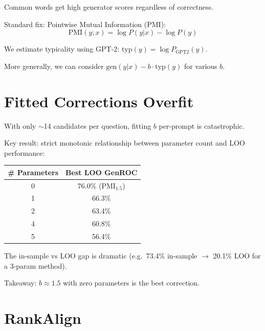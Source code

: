 \documentclass[11pt]{article}
\begin{document}
Common words get high generator scores regardless of correctness.

Standard fix: Pointwise Mutual Information (PMI):
\[
  \text{PMI}(y; x) = \log P(y|x) - \log P(y)
\]

We estimate typicality using GPT-2: $\text{typ}(y) = \log P_{\text{GPT2}}(y)$.

More generally, we can consider $\text{gen}(y|x) - b \cdot \text{typ}(y)$ for various $b$.



\section{Fitted Corrections Overfit}

With only $\sim$14 candidates per question, fitting $b$ per-prompt is catastrophic.

Key result: strict monotonic relationship between parameter count and LOO performance:
\begin{center}
\begin{tabular}{cc}
  \# Parameters & Best LOO GenROC \\
  \hline
  0 & 76.0\% (PMI$_{1.5}$) \\
  1 & 66.3\% \\
  2 & 63.4\% \\
  4 & 60.8\% \\
  5 & 56.4\% \\
\end{tabular}
\end{center}

The in-sample vs LOO gap is dramatic (e.g.\ 73.4\% in-sample $\to$ 20.1\% LOO for a 3-param method).

Takeaway: $b \approx 1.5$ with zero parameters is the best correction.



\section{RankAlign}
\end{document}
